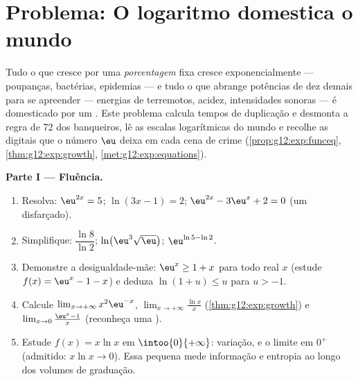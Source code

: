 \section{Problema: O logaritmo domestica o mundo}

\begin{problem}
\label{pb:g12:exp:1}
Tudo o que cresce por uma \emph{porcentagem} fixa cresce
exponencialmente --- poupanças, bactérias, epidemias --- e tudo o
que abrange potências de dez demais para se apreender --- energias
de terremotos, acidez, intensidades sonoras --- é domesticado por
um . Este problema calcula tempos de duplicação e desmonta
a regra de 72 dos banqueiros, lê as escalas logarítmicas do mundo e
recolhe as digitais que o número $\eu$ deixa em cada cena de crime
(\cref{prop:g12:exp:funceq}, \cref{thm:g12:exp:growth},
\cref{met:g12:exp:equations}).

\medskip
\noindent\textbf{Parte I --- Fluência.}
\begin{enumerate}
  \item Resolva: $\eu^{2x} = 5$; \quad $\ln(3x - 1) = 2$; \quad
        $\eu^{2x} - 3\eu^x + 2 = 0$ (um 
        disfarçado).
  \item Simplifique: $\dfrac{\ln 8}{\ln 2}$; \quad
        $\ln\!\left(\eu^3 \sqrt{\eu}\right)$; \quad
        $\eu^{\ln 5 - \ln 2}$.
  \item Demonstre a desigualdade-mãe: $\eu^x \geq 1 + x$ para
        todo real $x$ (estude $f(x) = \eu^x - 1 - x$) e deduza
        $\ln(1 + u) \leq u$ para $u > -1$.
  \item Calcule $\lim_{x \to +\infty} x^2 \eu^{-x}$,
        $\lim_{x \to +\infty} \frac{\ln x}{x}$
        (\cref{thm:g12:exp:growth}) e
        $\lim_{x \to 0} \frac{\eu^x - 1}{x}$ (reconheça uma
        ).
  \item Estude $f(x) = x \ln x$ em $\intoo{0}{+\infty}$:
        variação,  e o limite em $0^+$ (admitido:
        $x \ln x \to 0$). Essa pequena  mede informação e
        entropia ao longo dos volumes de graduação.
\end{enumerate}


\end{problem}
